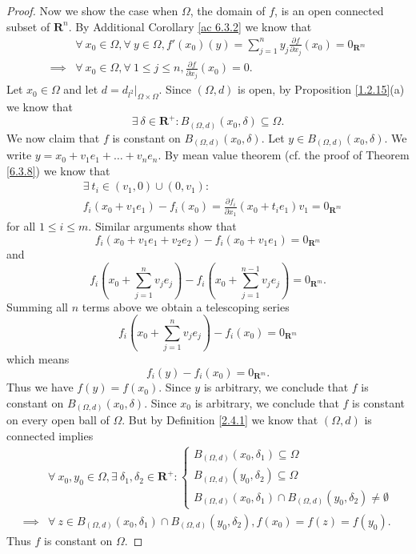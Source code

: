 \begin{proof}
    Now we show the case when \(\Omega\), the domain of \(f\), is an open connected subset of \(\mathbf{R}^n\).
    By Additional Corollary \ref{ac 6.3.2} we know that
    \begin{align*}
                 & \forall\ x_0 \in \Omega, \forall\ y \in \Omega, f'(x_0)(y) = \sum_{j = 1}^n y_j \frac{\partial f}{\partial x_j}(x_0) = 0_{\mathbf{R}^m} \\
        \implies & \forall\ x_0 \in \Omega, \forall\ 1 \leq j \leq n, \frac{\partial f}{\partial x_j}(x_0) = 0.
    \end{align*}
    Let \(x_0 \in \Omega\) and let \(d = d_{l^2}|_{\Omega \times \Omega}\).
    Since \((\Omega, d)\) is open, by Proposition \ref{1.2.15}(a) we know that
    \[
        \exists\ \delta \in \mathbf{R}^+ : B_{(\Omega, d)}(x_0, \delta) \subseteq \Omega.
    \]
    We now claim that \(f\) is constant on \(B_{(\Omega, d)}(x_0, \delta)\).
    Let \(y \in B_{(\Omega, d)}(x_0, \delta)\).
    We write \(y = x_0 + v_1 e_1 + \dots + v_n e_n\).
    By mean value theorem (cf. the proof of Theorem \ref{6.3.8}) we know that
    \begin{align*}
         & \exists\ t_i \in (v_1, 0) \cup (0, v_1) :                                                               \\
         & f_i(x_0 + v_1 e_1) - f_i(x_0) = \frac{\partial f_i}{\partial x_1}(x_0 + t_i e_1) v_1 = 0_{\mathbf{R}^m}
    \end{align*}
    for all \(1 \leq i \leq m\).
    Similar arguments show that
    \[
        f_i(x_0 + v_1 e_1 + v_2 e_2) - f_i(x_0 + v_1 e_1) = 0_{\mathbf{R}^m}
    \]
    and
    \[
        f_i(x_0 + \sum_{j = 1}^n v_j e_j) - f_i(x_0 + \sum_{j = 1}^{n - 1} v_j e_j) = 0_{\mathbf{R}^m}.
    \]
    Summing all \(n\) terms above we obtain a telescoping series
    \[
        f_i(x_0 + \sum_{j = 1}^n v_j e_j) - f_i(x_0) = 0_{\mathbf{R}^m}
    \]
    which means
    \[
        f_i(y) - f_i(x_0) = 0_{\mathbf{R}^m}.
    \]
    Thus we have \(f(y) = f(x_0)\).
    Since \(y\) is arbitrary, we conclude that \(f\) is constant on \(B_{(\Omega, d)}(x_0, \delta)\).
    Since \(x_0\) is arbitrary, we conclude that \(f\) is constant on every open ball of \(\Omega\).
    But by Definition \ref{2.4.1} we know that \((\Omega, d)\) is connected implies
    \begin{align*}
                 & \forall\ x_0, y_0 \in \Omega, \exists\ \delta_1, \delta_2 \in \mathbf{R}^+ : \begin{cases}
            B_{(\Omega, d)}(x_0, \delta_1) \subseteq \Omega \\
            B_{(\Omega, d)}(y_0, \delta_2) \subseteq \Omega \\
            B_{(\Omega, d)}(x_0, \delta_1) \cap B_{(\Omega, d)}(y_0, \delta_2) \neq \emptyset
        \end{cases}    \\
        \implies & \forall\ z \in B_{(\Omega, d)}(x_0, \delta_1) \cap B_{(\Omega, d)}(y_0, \delta_2), f(x_0) = f(z) = f(y_0).
    \end{align*}
    Thus \(f\) is constant on \(\Omega\).
\end{proof}